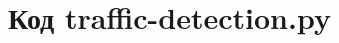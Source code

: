 \documentclass[bachelor, och, coursework]{SCWorks}
\begin{document}
\begin{thebibliography}{15}
  \end{thebibliography}

  \appendix

    \section{Код traffic-detection.py}
\end{document}

